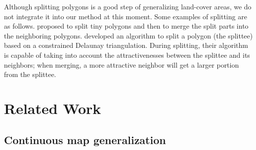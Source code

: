 \documentclass[acmsmall,natbib=false]{acmart}
\begin{document}
Although splitting polygons is a good step
of generalizing land-cover areas,
we do not integrate it into our method at this moment.
Some examples of splitting are as follows.
\textcite{Smith2007MasterMap,Thiemann2018LandCover} 
proposed to split tiny polygons 
and then to merge the split parts into the neighboring polygons.
\textcite{Meijers2016Split} developed an algorithm 
to split a polygon (the splittee) 
based on a constrained Delaunay triangulation.
During splitting, their algorithm is capable of
taking into account
the attractivenesses between the splittee and its neighbors;
when merging, a more attractive neighbor 
will get a larger portion from the splittee.

\section{Related Work}
\label{sec:AreaAgg_RelatedWork}

\subsection{Continuous map generalization}
\end{document}
